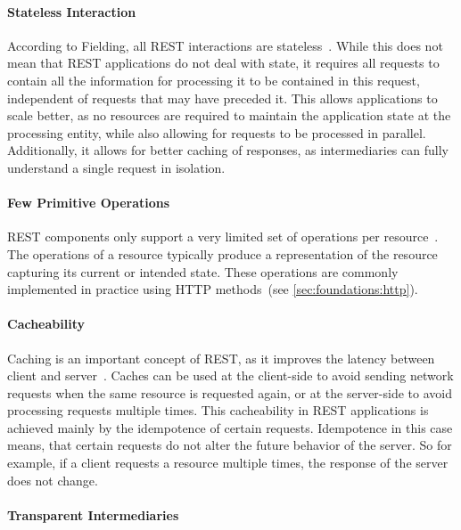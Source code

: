 \paragraph{Stateless Interaction}

According to Fielding, all \ac{REST} interactions are stateless~\cite{Fielding2000}.
While this does not mean that \ac{REST} applications do not deal with state, it requires all requests to contain all the information for processing it to be contained in this request, independent of requests that may have preceded it.
This allows applications to scale better, as no resources are required to maintain the application state at the processing entity, while also allowing for requests to be processed in parallel.
Additionally, it allows for better caching of responses, as intermediaries can fully understand a single request in isolation.

\paragraph{Few Primitive Operations}

\ac{REST} components only support a very limited set of operations per resource~\cite{Erenkrantz2007}.
The operations of a resource typically produce a representation of the resource capturing its current or intended state.
These operations are commonly implemented in practice using \ac{HTTP} methods~(see \autoref{sec:foundations:http}).

\paragraph{Cacheability}

Caching is an important concept of \ac{REST}, as it improves the latency between client and server~\cite{Erenkrantz2007,Fielding2000}.
Caches can be used at the client-side to avoid sending network requests when the same resource is requested again, or at the server-side to avoid processing requests multiple times.
This cacheability in \ac{REST} applications is achieved mainly by the idempotence of certain requests.
Idempotence in this case means, that certain requests do not alter the future behavior of the server.
So for example, if a client requests a resource multiple times, the response of the server does not change.

\paragraph{Transparent Intermediaries}

